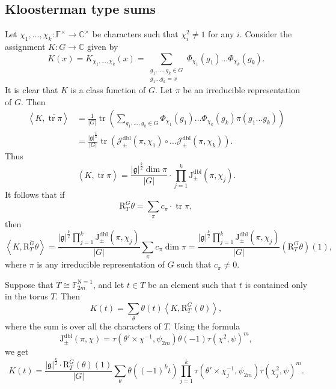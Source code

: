 \documentclass[12pt, reqno]{amsart}
\theoremstyle{definition}
\theoremstyle{definition}
\theoremstyle{definition}
\newcommand{\cComplex}{\mathbb{C}}
\newcommand{\multiplicativegroup}[1]{#1^{\times}}
\newcommand{\conjugate}[1]{\overline{#1}}
\newcommand{\sizeof}[1]{\left|#1\right|}
\newcommand{\innerproduct}[2]{\left\langle #1,#2\right\rangle}
\newcommand{\fieldCharacter}{\psi}
\newcommand{\trace}{\operatorname{tr}}
\newcommand{\aFieldNorm}{\mathrm{N}}
\newcommand{\finiteField}{\mathbb{F}}
\newcommand{\finiteFieldExtension}[1]{\finiteField_{#1}}
\newcommand{\NormOneGroup}[1]{\finiteFieldExtension{#1}^{\aFieldNorm = 1}}
\newcommand{\dblJacobiSum}[2]{\mathcal{J}_{\pm}^{\mathrm{dbl}}\left(#1, #2\right)}
\newcommand{\dblJacobiSumScalar}[2]{\mathrm{J}_{\pm}^{\mathrm{dbl}}\left(#1, #2\right)}
\newcommand{\lieAlgebra}{\mathfrak{g}}
\newcommand{\DeligneLusztigInduction}[2]{\mathrm{R}_{#1}^{#2}}
\begin{document}
\subsection{Kloosterman type sums}

Let $\chi_1, \dots, \chi_k \colon \multiplicativegroup{\finiteField} \to \multiplicativegroup{\cComplex}$ be characters such that $\chi_i^2 \ne 1$ for any $i$. Consider the assignment $K \colon G \to \cComplex$ given by $$K\left(x\right) = K_{\chi_1,\dots,\chi_k}\left(x\right) = \sum_{\substack{g_1, \dots, g_k \in G\\
g_1 \dots g_k = x}} \Phi_{\chi_1}\left(g_1\right) \dots \Phi_{\chi_k}\left(g_k\right).$$
It is clear that $K$ is a class function of $G$. Let $\pi$ be an irreducible representation of $G$. Then \begin{align*}
	 \innerproduct{K}{\conjugate{\trace \pi}} &= \frac{1}{\sizeof{G}}\trace \left(\sum_{g_1,\dots,g_k \in G} \Phi_{\chi_1}\left(g_1\right) \dots \Phi_{\chi_k}\left(g_k\right) \pi\left(g_1 \dots g_k\right) \right) \\
	 &= \frac{\sizeof{\lieAlgebra}^{\frac{k}{2}}}{\sizeof{G}} \trace\left( \dblJacobiSum{\pi}{\chi_1} \circ \dots \dblJacobiSum{\pi}{\chi_k} \right).
\end{align*}
Thus $$\innerproduct{K}{\conjugate{\trace \pi}} = \frac{\sizeof{\lieAlgebra}^{\frac{k}{2}} \dim \pi}{\sizeof{G}} \cdot \prod_{j=1}^k \dblJacobiSumScalar{\pi}{\chi_j}.$$
It follows that if
$$\DeligneLusztigInduction{T}{G}\theta = \sum_{\pi} c_{\pi} \cdot \trace \pi,$$
then $$\innerproduct{K}{\conjugate{\DeligneLusztigInduction{T}{G}\theta}} = \frac{\sizeof{\lieAlgebra}^{\frac{k}{2}} \prod_{j=1}^k \dblJacobiSumScalar{\pi}{\chi_j}}{\sizeof{G}} \sum_{\pi} c_{\pi} \dim \pi = \frac{\sizeof{\lieAlgebra}^{\frac{k}{2}} \prod_{j=1}^k \dblJacobiSumScalar{\pi}{\chi_j}}{\sizeof{G}} \left(\DeligneLusztigInduction{T}{G}\theta\right)\left(1\right),$$
where $\pi$ is any irreducible representation of $G$ such that $c_{\pi} \ne 0$.

Suppose that $T \cong \NormOneGroup{2m}$, and let $t \in T$ be an element such that $t$ is contained only in the torus $T$. Then
$$K\left(t\right) = \sum_{\theta} \theta\left(t\right) \innerproduct{K}{\DeligneLusztigInduction{T}{G}\left(\theta\right)},$$
where the sum is over all the characters of $T$. Using the formula $$\dblJacobiSumScalar{\pi}{\chi} = \tau\left( \theta' \times \chi^{-1}, \fieldCharacter_{2m} \right) \theta\left(-1\right) \tau\left(\chi^2, \fieldCharacter\right)^m,$$
we get
$$K\left(t\right) = \frac{\sizeof{\lieAlgebra}^{\frac{k}{2}} \cdot \DeligneLusztigInduction{T}{G}\left(\theta\right)\left(1\right)}{\sizeof{G}} \sum_{\theta} \theta\left( \left(-1\right)^k t\right) \prod_{j=1}^k \tau\left(\theta' \times \chi_j^{-1}, \fieldCharacter_{2m}\right) \tau\left(\chi_j^2, \fieldCharacter\right)^m.$$
\end{document}

